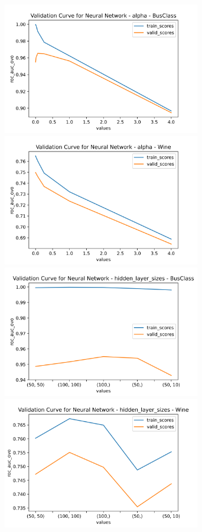 \documentclass[
	letterpaper, %
]{jdf}
\begin{document}
\includegraphics[width=3.4in]{Figures/BusClass-0920/NN/val_curve_0.png}
\includegraphics[width=3.4in]{Figures/Wine-0921/NN/val_curve_0.png}
\includegraphics[width=3.4in]{Figures/BusClass-0920/NN/val_curve_1.png}
\includegraphics[width=3.4in]{Figures/Wine-0921/NN/val_curve_1.png}
\end{document}
